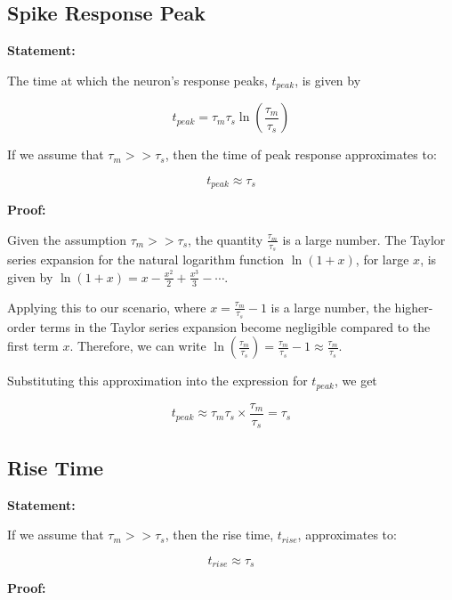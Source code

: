 \subsection{Spike Response Peak}

\textbf{Statement:}

The time at which the neuron's response peaks, $t_{peak}$, is given by

\begin{equation}
t_{peak} = \tau_m \tau_s \ln\left(\frac{\tau_m}{\tau_s}\right)
\end{equation}

If we assume that $\tau_m >> \tau_s$, then the time of peak response approximates to:

\begin{equation}
t_{peak} \approx \tau_s
\end{equation}

\textbf{Proof:}

Given the assumption $\tau_m >> \tau_s$, the quantity $\frac{\tau_m}{\tau_s}$ is a large number. The Taylor series expansion for the natural logarithm function $\ln(1 + x)$, for large $x$, is given by $\ln(1 + x) = x - \frac{x^2}{2} + \frac{x^3}{3} - \cdots$.

Applying this to our scenario, where $x = \frac{\tau_m}{\tau_s} - 1$ is a large number, the higher-order terms in the Taylor series expansion become negligible compared to the first term $x$. Therefore, we can write $\ln\left(\frac{\tau_m}{\tau_s}\right) = \frac{\tau_m}{\tau_s} - 1 \approx \frac{\tau_m}{\tau_s}$.

Substituting this approximation into the expression for $t_{peak}$, we get

\begin{equation}
t_{peak} \approx \tau_m \tau_s \times \frac{\tau_m}{\tau_s} = \tau_s
\end{equation}

\subsection{Rise Time}

\textbf{Statement:}

If we assume that $\tau_m >> \tau_s$, then the rise time, $t_{rise}$, approximates to:

\begin{equation}
t_{rise} \approx \tau_s
\end{equation}

\textbf{Proof:}

